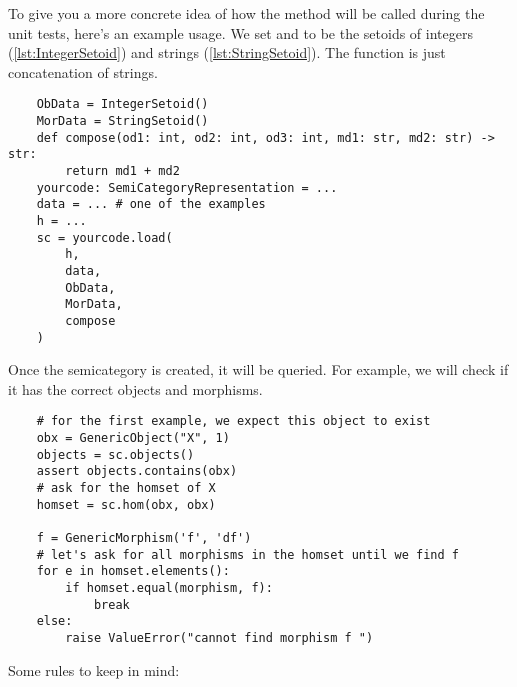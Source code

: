 To give you a more concrete idea of how the method will be called during the unit tests, here's an example usage.
We set  and  to be the setoids of integers (\cref{lst:IntegerSetoid}) and strings (\cref{lst:StringSetoid}).
The  function is just concatenation of strings.

\begin{verbatim}
    ObData = IntegerSetoid()
    MorData = StringSetoid()
    def compose(od1: int, od2: int, od3: int, md1: str, md2: str) -> str:
        return md1 + md2
    yourcode: SemiCategoryRepresentation = ...
    data = ... # one of the examples
    h = ...
    sc = yourcode.load(
        h,
        data,
        ObData,
        MorData,
        compose
    )
\end{verbatim}

Once the semicategory is created, it will be queried.
For example, we will check if it has the correct objects and morphisms.

\begin{verbatim}
    # for the first example, we expect this object to exist
    obx = GenericObject("X", 1)
    objects = sc.objects()
    assert objects.contains(obx)
    # ask for the homset of X
    homset = sc.hom(obx, obx)

    f = GenericMorphism('f', 'df')
    # let's ask for all morphisms in the homset until we find f
    for e in homset.elements():
        if homset.equal(morphism, f):
            break
    else:
        raise ValueError("cannot find morphism f ")
\end{verbatim}
\begin{widepar}
    \hfill
    \begin{minipage}{8cm}
    \end{minipage}
    \hfill
    \begin{minipage}{8cm}
    \end{minipage}
    \hfill
\end{widepar}


Some rules to keep in mind:

